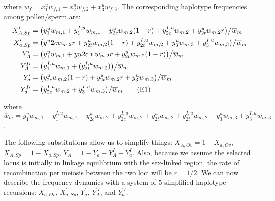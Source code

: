 \documentclass{article}
\newcommand\numberthis{\addtocounter{equation}{1}\tag{\theequation}}
\begin{document}
\begin{appendices}
\noindent where $\overline{w}_f = x^u_{1} w_{f,1} + x^u_{2} w_{f,2} + x^u_{3} w_{f,3}$. The corresponding haplotype frequencies among pollen/sperm are:
\begin{align*}
	X^{\prime}_{A,Sp} &= \big(y^u_1 w_{m,1} + y^{I,u}_1 w_{m,1} + y^u_{2c} w_{m,2} (1 - r) + y^{I,u}_{2c} w_{m,2} + y^u_{2t} w_{m,2} r \big) \big/ \overline{w}_m \\
	X^{\prime}_{a,Sp} &= \big(y^u{2c} w_{m,2} r + y^u_{2t} w_{m,2} (1 - r) + y^{I,u}_{2t} w_{m,2} + y^u_3 w_{m,3} + y^{I,u}_3 w_{m,3} \big) \big/ \overline{w}_m \\
	Y^{\prime}_{A} &= \big( y^u_1 w_{m,1} + yu2c*w_{m,2} r + y^u_{2t} w_{m,2} (1 - r) \big) \big/ \overline{w}_m \\
	Y^{I \prime}_{A} &= \big( y^{I,u}_1 w_{m,1} + (y^{I,u}_{2t} w_{m,2}) \big) \big/ \overline{w}_m \\
	Y^{\prime}_{a} &= \big( y^u_{2c} w_{m,2} (1 - r) + y^u_{2t} w_{m,2} r + y^u_3 w_{m,3} \big) \big/ \overline{w}_m \\
	Y^{I \prime}_{a} &= \big( y^{I,u}_{2c} w_{m,2} + y^{I,u}_3 w_{m,3} \big) \big/ \overline{w}_m \numberthis
\end{align*}

\noindent where $\overline{w}_{m} = y^u_1 w_{m,1} + y^{I,u}_1 w_{m,1} + y^u_{2c} w_{m,2} + y^{I,u}_{2c} w_{m,2} + y^u_{2t} w_{m,2} + y^{I,u}_{2t} w_{m,2} + y^u_3 w_{m,3} + y^{I,u}_3 w_{m,3}$.

\bigskip

\noindent The following substitutions allow us to simplify things: $X_{A,Ov} = 1 - X_{a,Ov}$, $X_{A,Sp} = 1 - X_{a,Sp}$, $Y_{A} = 1 - Y_a - Y_A^I - Y_a^I$. Also, because we assume the selected locus is initially in linkage equilibrium with the sex-linked region, the rate of recombination per meiosis between the two loci will be $r = 1/2$. We can now describe the frequency dynamics with a system of $5$ simplified haplotype recursions: $X^{\prime}_{a,Ov}$, $X^{\prime}_{a,Sp}$, $Y^{\prime}_{a}$, $Y^{\prime I}_{A}$, and $Y^{\prime I}_{a}$.
\bigskip


\end{appendices}
\end{document}
